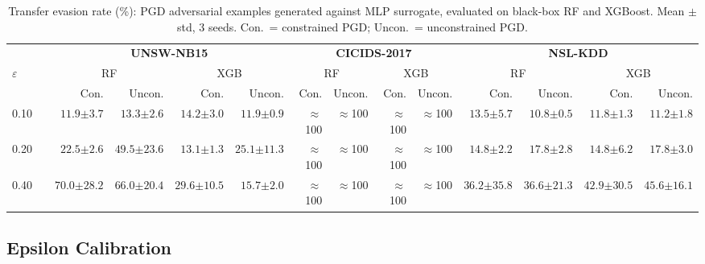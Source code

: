 \documentclass[sigconf,anonymous=true]{acmart}
\begin{document}
\begin{table}[t]
\centering
\caption{Transfer evasion rate (\%): PGD adversarial examples generated
         against MLP surrogate, evaluated on black-box RF and XGBoost.
         Mean $\pm$ std, 3 seeds.  Con.~= constrained PGD;
         Uncon.~= unconstrained PGD.}
\label{tab:transfer}
\small
\begin{tabular}{l r rr rr rr rr rr rr}
\toprule
 & & \multicolumn{4}{c}{\textbf{UNSW-NB15}} &
     \multicolumn{4}{c}{\textbf{CICIDS-2017}} &
     \multicolumn{4}{c}{\textbf{NSL-KDD}} \\
\cmidrule(lr){3-6}\cmidrule(lr){7-10}\cmidrule(lr){11-14}
$\varepsilon$ & & \multicolumn{2}{c}{RF} & \multicolumn{2}{c}{XGB} &
                   \multicolumn{2}{c}{RF} & \multicolumn{2}{c}{XGB} &
                   \multicolumn{2}{c}{RF} & \multicolumn{2}{c}{XGB} \\
\cmidrule(lr){3-4}\cmidrule(lr){5-6}\cmidrule(lr){7-8}\cmidrule(lr){9-10}
\cmidrule(lr){11-12}\cmidrule(lr){13-14}
 & & Con. & Uncon. & Con. & Uncon. & Con. & Uncon. & Con. & Uncon. &
     Con. & Uncon. & Con. & Uncon. \\
\midrule
0.10 & &
  $11.9{\scriptstyle\pm3.7}$ & $13.3{\scriptstyle\pm2.6}$ &
  $14.2{\scriptstyle\pm3.0}$ & $11.9{\scriptstyle\pm0.9}$ &
  $\approx$100 & $\approx$100 & $\approx$100 & $\approx$100 &
  $13.5{\scriptstyle\pm5.7}$ & $10.8{\scriptstyle\pm0.5}$ &
  $11.8{\scriptstyle\pm1.3}$ & $11.2{\scriptstyle\pm1.8}$ \\
0.20 & &
  $22.5{\scriptstyle\pm2.6}$ & $49.5{\scriptstyle\pm23.6}$ &
  $13.1{\scriptstyle\pm1.3}$ & $25.1{\scriptstyle\pm11.3}$ &
  $\approx$100 & $\approx$100 & $\approx$100 & $\approx$100 &
  $14.8{\scriptstyle\pm2.2}$ & $17.8{\scriptstyle\pm2.8}$ &
  $14.8{\scriptstyle\pm6.2}$ & $17.8{\scriptstyle\pm3.0}$ \\
0.40 & &
  $70.0{\scriptstyle\pm28.2}$ & $66.0{\scriptstyle\pm20.4}$ &
  $29.6{\scriptstyle\pm10.5}$ & $15.7{\scriptstyle\pm2.0}$ &
  $\approx$100 & $\approx$100 & $\approx$100 & $\approx$100 &
  $36.2{\scriptstyle\pm35.8}$ & $36.6{\scriptstyle\pm21.3}$ &
  $42.9{\scriptstyle\pm30.5}$ & $45.6{\scriptstyle\pm16.1}$ \\
\bottomrule
\end{tabular}
\end{table}

\subsection{Epsilon Calibration}
\end{document}
